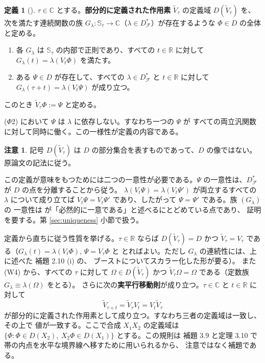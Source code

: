 \documentclass[11pt,a4paper]{article}
\newcommand{\Fields}{\mathcal{F}}
\newcommand{\Strip}{\mathbb{S}}
\newcommand{\Vt}{\widetilde{V}}
\newcommand{\Dom}{D}
\newcommand{\Dstar}{\Dom^{*}_{\Fields}}
\theoremstyle{definition}
\newtheorem{definition}[theorem]{定義}
\newtheorem{remark}[theorem]{注意}
\newcommand{\srcnum}[1]{\renewcommand{\thetheorem}{#1}}
\begin{document}
\srcnum{3.1}
\begin{definition}[\cite{T26}]
\label{def:vtilde}
$\tau \in \mathbb{C}$ とする。\textbf{部分的に定義された作用素} $\Vt_\tau$ の定義域
$\Dom(\Vt_\tau)$ を、次を満たす連続関数の族
$G_\lambda : \Strip_\tau \to \mathbb{C}$（$\lambda \in \Dstar$）が存在するような
$\Phi \in \Dom$ の全体と定める。
\begin{enumerate}
  \item[($\Phi$1)] 各 $G_\lambda$ は $\Strip_\tau$ の内部で正則であり、すべての
    $t \in \mathbb{R}$ に対して $G_\lambda(t) = \lambda(V_t\Phi)$ を満たす。
  \item[($\Phi$2)] ある $\Psi \in \Dom$ が存在して、すべての $\lambda \in \Dstar$ と
    $t \in \mathbb{R}$ に対して $G_\lambda(\tau + t) = \lambda(V_t\Psi)$ が成り立つ。
\end{enumerate}
このとき $\Vt_\tau \Phi := \Psi$ と定める。
\end{definition}

($\Phi$2) において $\Psi$ は $\lambda$ に依存しない。すなわち一つの $\Psi$ が
すべての両立汎関数に対して同時に働く。この一様性が定義の内容である。

\srcnum{B}
\begin{remark}
記号 $\Dom(\Vt_\tau)$ は $\Dom$ の部分集合を表すものであって、$\Dom$ の像ではない。
原論文の記法に従う。
\end{remark}

この定義が意味をもつためには二つの一意性が必要である。$\Psi$ の一意性は、$\Dstar$ が $\Dom$ の点を分離することから従う。
$\lambda(V_t\Psi) = \lambda(V_t\Psi')$ が両立するすべての $\lambda$ について成り立てば
$V_t\Psi = V_t\Psi'$ であり、したがって $\Psi = \Psi'$ である。族 $(G_\lambda)$ の
一意性は \cite{T26} が「必然的に一意である」と述べるにとどめている点であり、
証明を要する。第 \ref{sec:uniqueness} 小節で扱う。

定義から直ちに従う性質を挙げる。$\tau \in \mathbb{R}$ ならば $\Dom(\Vt_\tau) = \Dom$ かつ
$\Vt_\tau = V_\tau$ である（$G_\lambda(t) = \lambda(V_t\Phi)$, $\Psi = V_\tau\Phi$ と
とればよい。ただし $G_\lambda$ の連続性には、上に述べた \cite{CRTT25} 補題 2.10 (i) の、
ブーストについてスカラー化した形が要る）。
また (W4) から、すべての $\tau$ に対して $\Omega \in \Dom(\Vt_\tau)$ かつ
$\Vt_\tau\Omega = \Omega$ である（定数族 $G_\lambda \equiv \lambda(\Omega)$ をとる）。
さらに次の\textbf{実平行移動則}が成り立つ。$\tau \in \mathbb{C}$ と $t \in \mathbb{R}$ に対して
\begin{equation}
  \label{eq:translation}
  \Vt_{\tau + t} = \Vt_\tau V_t = V_t \Vt_\tau
\end{equation}
が部分的に定義された作用素として成り立つ。すなわち三者の定義域は一致し、その上で
値が一致する。ここで合成 $X_1 X_2$ の定義域は
$\{\Phi : \Phi \in \Dom(X_2),\ X_2\Phi \in \Dom(X_1)\}$ とする。この規則は
補題 3.9 と定理 3.10 で帯の内点を水平な境界線へ移すために用いられるから、
注意ではなく補題である。
\end{document}
